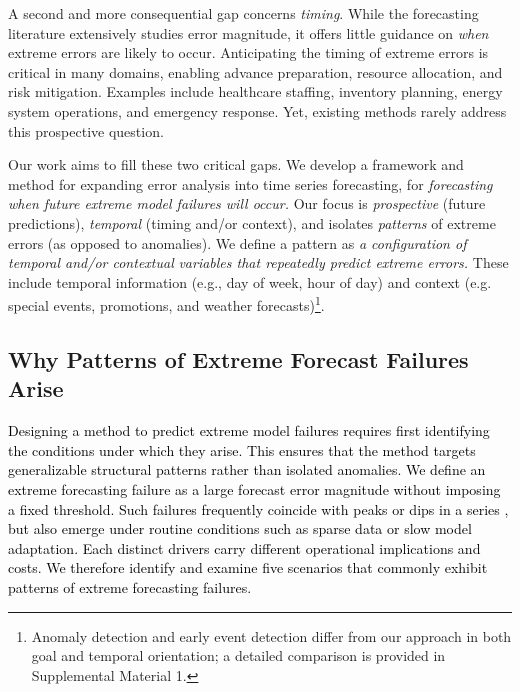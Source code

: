 \documentclass[12pt]{article}
\newcommand{\matt}[1]{\textcolor{black}{#1}}
\begin{document}
A second and more consequential gap concerns \emph{timing}. While the forecasting literature extensively studies error magnitude, it offers little guidance on \emph{when} extreme errors are likely to occur. Anticipating the timing of extreme errors is critical in many domains, enabling advance preparation, resource allocation, and risk mitigation. Examples include healthcare staffing, inventory planning, energy system operations, and emergency response. Yet, existing methods rarely address this prospective question.

Our work aims to fill these two critical gaps. We develop a framework and method for expanding error analysis into time series forecasting, for \textit{forecasting} \textit{when future extreme model failures will occur.} Our focus is \textit{prospective} (future predictions), \textit{temporal} (timing and/or context), and isolates \textit{patterns} of extreme errors (as opposed to anomalies). We define a pattern as \textit{a configuration of temporal and/or contextual} \textit{variables that repeatedly predict extreme errors.} These include temporal information (e.g., day of week, hour of day) and context (e.g. special events, promotions, and weather forecasts)\footnote{Anomaly detection and early event detection differ from our approach in both goal and temporal orientation; a detailed comparison is provided in Supplemental Material 1.}.

\renewcommand{\arraystretch}{1.3}


\subsection{Why Patterns of Extreme Forecast Failures Arise}%

\matt{Designing a method to predict extreme model failures requires first identifying the conditions under which they arise. This ensures that the method targets generalizable structural patterns rather than isolated anomalies. We define an extreme forecasting failure as a large forecast error magnitude without imposing a fixed threshold.  Such failures frequently coincide with peaks or dips in a series \citep{marvin2022}, but also emerge under routine conditions such as sparse data or slow model adaptation. Each distinct drivers carry different operational implications and costs. We therefore identify and examine five scenarios that commonly exhibit patterns of extreme forecasting failures.}
\end{document}
